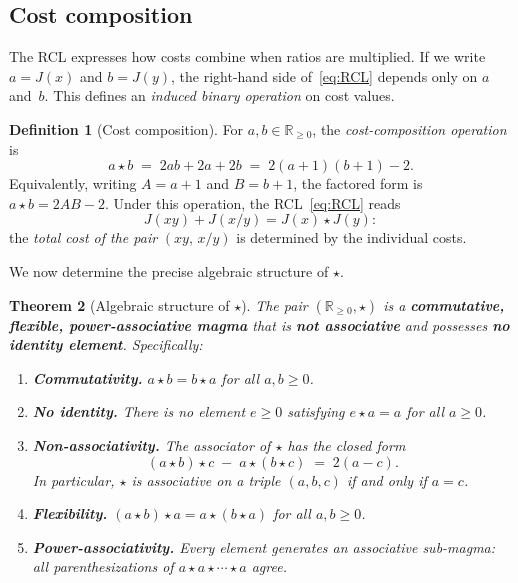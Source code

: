 \documentclass[11pt,a4paper]{article}
\theoremstyle{plain}
\newtheorem{theorem}{Theorem}[section]
\theoremstyle{definition}
\newtheorem{definition}[theorem]{Definition}
\theoremstyle{remark}
\newcommand{\Jcost}{J}
\newcommand{\RR}{\mathbb{R}}
\begin{document}
\subsection{Cost composition}\label{ssec:star}

The RCL expresses how costs combine when ratios are multiplied.
If we write $a=\Jcost(x)$ and $b=\Jcost(y)$, the right-hand side
of~\eqref{eq:RCL} depends only on $a$ and~$b$.  This defines an
\emph{induced binary operation} on cost values.

\begin{definition}[Cost composition]\label{def:star}
For $a,b\in\RR_{\ge0}$, the \emph{cost-composition operation} is
\begin{equation}\label{eq:star}
  a\star b \;=\; 2ab+2a+2b \;=\; 2(a{+}1)(b{+}1)-2.
\end{equation}
Equivalently, writing $A=a+1$ and $B=b+1$, the factored form is
$a\star b = 2AB - 2$.  Under this operation, the
RCL~\eqref{eq:RCL} reads
\begin{equation}\label{eq:RCL-star}
  \Jcost(xy)+\Jcost(x/y) = \Jcost(x)\star\Jcost(y):
\end{equation}
the \emph{total cost of the pair} $(xy,\,x/y)$ is determined by the
individual costs.
\end{definition}

We now determine the precise algebraic structure of $\star$.

\begin{theorem}[Algebraic structure of $\star$]\label{thm:star-structure}
The pair $(\RR_{\ge0},\star)$ is a \textbf{commutative, flexible,
power-associative magma} that is \textbf{not associative} and
possesses \textbf{no identity element}.  Specifically:
\begin{enumerate}[nosep,label=\textup{(\alph*)}]
\item \textbf{Commutativity.}  $a\star b = b\star a$ for all
      $a,b\ge0$.
\item \textbf{No identity.}  There is no element $e\ge0$ satisfying
      $e\star a=a$ for all $a\ge0$.
\item \textbf{Non-associativity.}  The \emph{associator} of $\star$
      has the closed form
      \begin{equation}\label{eq:associator}
        (a\star b)\star c \;-\; a\star(b\star c)
        \;=\; 2(a-c).
      \end{equation}
      In particular, $\star$ is associative on a triple $(a,b,c)$ if
      and only if $a=c$.
\item \textbf{Flexibility.}  $(a\star b)\star a = a\star(b\star a)$
      for all $a,b\ge0$.
\item \textbf{Power-associativity.}  Every element generates an
      associative sub-magma: all parenthesizations of
      $a\star a\star\cdots\star a$ agree.
\end{enumerate}
\end{theorem}
\end{document}
